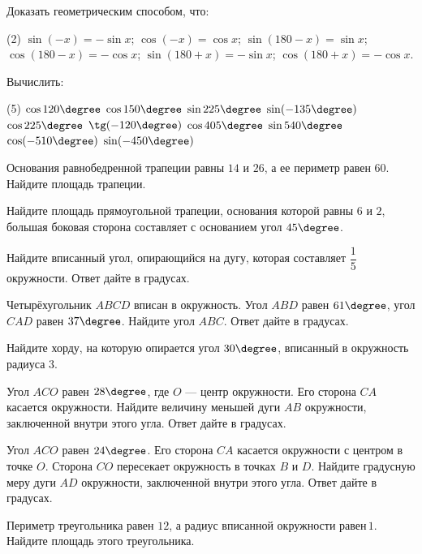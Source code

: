 \begin{class}[number=4]
	\begin{listofex}
				\item Доказать геометрическим способом, что:
		\begin{tasks}(2)
			\task \( \sin(-x) = -\sin x \);
			\task \( \cos(-x) = \cos x \);
			\task \( \sin(180 - x) = \sin x \);
			\task \( \cos(180 - x) = -\cos x \);
			\task \( \sin(180+x) = -\sin x \);
			\task \( \cos(180+x) = -\cos x \).
		\end{tasks}
		\item Вычислить:
		\begin{tasks}(5)
			\task \( \cos120\degree \)
			\task \( \cos150\degree \)
			\task \( \sin225\degree \)
			\task \( \sin(-135\degree )\)
			\task \( \cos225\degree \)
			\task \( \tg(-120\degree) \)
			\task \( \cos405\degree \)
			\task \( \sin540\degree \)
			\task \( \cos(-510\degree) \)
			\task \( \sin(-450\degree) \)
		\end{tasks}
		\item Основания равнобедренной трапеции равны \( 14 \) и \( 26 \), а ее периметр равен \( 60 \). Найдите площадь трапеции.
		\item Найдите площадь прямоугольной трапеции, основания которой равны \( 6 \) и \( 2 \), большая боковая сторона составляет с основанием угол \( 45\degree \).
		\item Найдите вписанный угол, опирающийся на дугу, которая составляет \( \dfrac{1}{5} \) окружности. Ответ дайте в градусах.
		\item Четырёхугольник \( ABCD \) вписан в окружность. Угол \( ABD \) равен \( 61\degree \), угол \( CAD \) равен \( 37\degree \). Найдите угол \( ABC \). Ответ дайте в градусах.
		\item Найдите хорду, на которую опирается угол \( 30\degree \), вписанный в окружность радиуса \( 3 \).
		\item Угол \( ACO \) равен \( 28\degree \), где \( O \) --- центр окружности. Его сторона \( CA \) касается окружности. Найдите величину меньшей дуги \( AB \) окружности, заключенной внутри этого угла. Ответ дайте в градусах.
		\item Угол \( ACO \) равен \( 24\degree \). Его сторона \( CA \) касается окружности с центром в точке \( O \). Сторона \( CO \) пересекает окружность в точках \( B \) и \( D \). Найдите градусную меру дуги \( AD \) окружности, заключенной внутри этого угла. Ответ дайте в градусах.
		\item Периметр треугольника равен \( 12 \), а радиус вписанной окружности равен \( 1 \). Найдите площадь этого треугольника.

\end{listofex}
\end{class}
